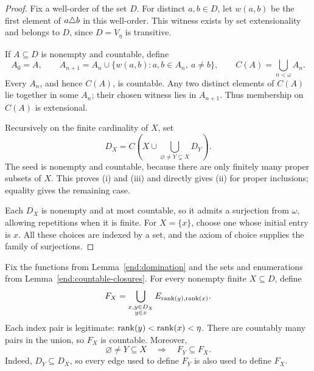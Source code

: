 \begin{proof}
Fix a well-order of the set \(D\).  For distinct \(a,b\in D\),
let \(w(a,b)\) be the first element of \(a\triangle b\) in this
well-order.  This witness exists by set extensionality and
belongs to \(D\), since \(D=V_\eta\) is transitive.

If \(A\subseteq D\) is nonempty and countable, define
\[
  A_0=A,\qquad
  A_{n+1}=A_n\cup
      \{w(a,b):a,b\in A_n,\ a\ne b\},
  \qquad
  C(A)=\bigcup_{n<\omega}A_n.
\]
Every \(A_n\), and hence \(C(A)\), is countable.  Any two
distinct elements of \(C(A)\) lie together in some \(A_n\);
their chosen witness lies in \(A_{n+1}\).  Thus membership
on \(C(A)\) is extensional.

Recursively on the finite cardinality of \(X\), set
\[
  D_X=C\left(
    X\cup
    \bigcup_{\varnothing\ne Y\subsetneq X}D_Y
  \right).
\]
The seed is nonempty and countable, because there are only
finitely many proper subsets of \(X\).  This proves
\textup{(i)} and \textup{(iii)} and directly gives
\textup{(ii)} for proper inclusions; equality gives the
remaining case.

Each \(D_X\) is nonempty and at most countable, so it admits
a surjection from \(\omega\), allowing repetitions when it
is finite.  For \(X=\{x\}\), choose one whose initial entry
is \(x\).  All these choices are indexed by a set, and
the axiom of choice supplies the family of surjections.
\end{proof}

Fix the functions from Lemma~\ref{end:domination} and the
sets and enumerations from Lemma~\ref{end:countable-closures}.
For every nonempty finite \(X\subseteq D\), define
\begin{equation}\label{end:bad-set}
  F_X=
  \bigcup_{\substack{x,y\in D_X\\y\in x}}
       E_{\operatorname{rank}(y),\operatorname{rank}(x)}.
\end{equation}
Each index pair is legitimate:
\(\operatorname{rank}(y)<\operatorname{rank}(x)<\eta\).  There are countably many
pairs in the union, so \(F_X\) is countable.  Moreover,
\begin{equation}\label{end:bad-monotone}
  \varnothing\ne Y\subseteq X
  \quad\Longrightarrow\quad
  F_Y\subseteq F_X.
\end{equation}
Indeed, \(D_Y\subseteq D_X\), so every edge used to define
\(F_Y\) is also used to define \(F_X\).

